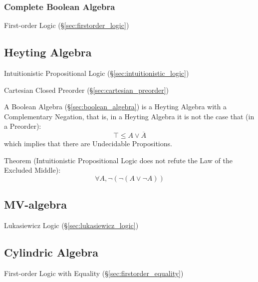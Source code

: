 \subsubsection{Complete Boolean Algebra}\label{sec:complete_boolean}

First-order Logic (\S\ref{sec:firstorder_logic})



\subsection{Heyting Algebra}\label{sec:heyting_algebra}

Intuitionistic Propositional Logic (\S\ref{sec:intuitionistic_logic})

Cartesian Closed Preorder (\S\ref{sec:cartesian_preorder})

A Boolean Algebra (\S\ref{sec:boolean_algebra}) is a Heyting Algebra
with a Complementary Negation, that is, in a Heyting Algebra it is not
the case that (in a Preorder):
\[
  \top \leq A \vee \overline{A}
\]
which implies that there are Undecidable Propositions.

Theorem (Intuitionistic Propositional Logic does not refute the Law of
the Excluded Middle)\cite{harper12}:
\[
  \forall A, \neg (\neg (A \vee \neg A))
\]



\subsection{MV-algebra}\label{sec:mv_algebra}

Lukasiewicz Logic (\S\ref{sec:lukasiewicz_logic})



\subsection{Cylindric Algebra}\label{sec:cylindric_algebra}

First-order Logic with Equality (\S\ref{sec:firstorder_equality})



